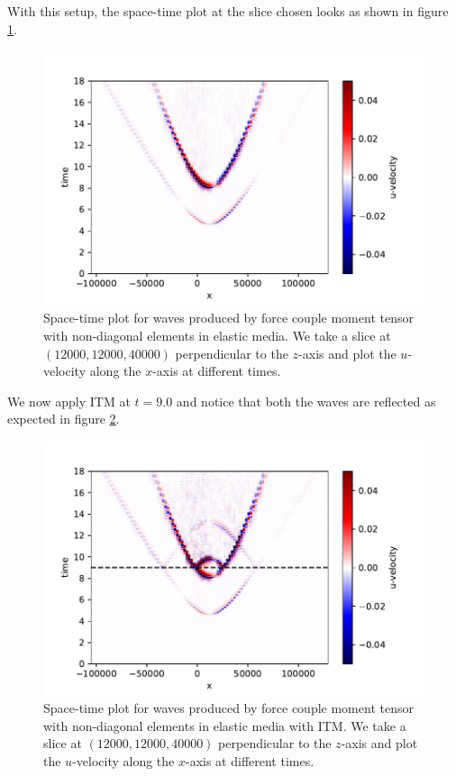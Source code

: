 With this setup, the space-time plot at the slice chosen looks as shown in figure \ref{fig:space-timeplot-doublecoupletorinoITM}.

\begin{figure}[htpb]
    \centering
    \includegraphics[width=0.8\linewidth]{figures/double-couple-tori-noITM.pdf}
    \caption{Space-time plot for waves produced by force couple moment tensor with non-diagonal elements in elastic media. We take a slice at $\left(12000,12000,40000\right)$ perpendicular to the $z$-axis and plot the $u$-velocity along the $x$-axis at different times.}
    \label{fig:space-timeplot-doublecoupletorinoITM}
\end{figure}

We now apply \ac{ITM} at $t=9.0$ and notice that both the waves are reflected as expected in figure \ref{fig:space-timeplot-doublecoupletoriITM}.

\begin{figure}[htpb]
    \centering
    \includegraphics[width=0.75\linewidth]{figures/double-couple-tori2.pdf}
    \caption{Space-time plot for waves produced by force couple moment tensor with non-diagonal elements in elastic media with \ac{ITM}. We take a slice at $\left(12000,12000,40000\right)$ perpendicular to the $z$-axis and plot the $u$-velocity along the $x$-axis at different times.}
    \label{fig:space-timeplot-doublecoupletoriITM}
\end{figure}

